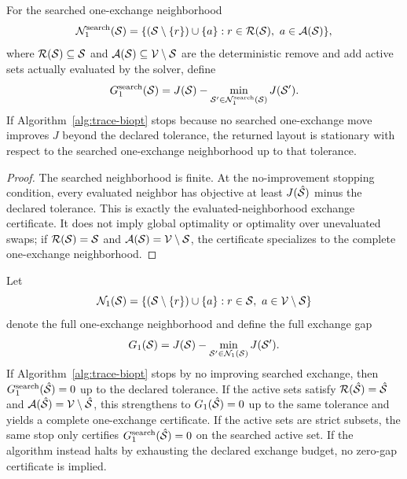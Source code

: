 \begin{theorem}
\label{thm:exchange}
For the searched one-exchange neighborhood
\[
    \mathcal{N}^{\mathrm{search}}_1(\calS)
    =
    \{(\calS\setminus\{r\})\cup\{a\}: r\in\calR(\calS),\ a\in\calA(\calS)\},
\]
where $\mathcal{R}(\mathcal{S})\subseteq\mathcal{S}$ and $\mathcal{A}(\mathcal{S})\subseteq\mathcal{V}\setminus\mathcal{S}$
are the deterministic remove and add active sets actually evaluated by the
solver, define
\[
    G^{\mathrm{search}}_1(\mathcal{S})
    =
    J(\mathcal{S})-\min_{\mathcal{S}'\in\mathcal{N}^{\mathrm{search}}_1(\mathcal{S})}J(\mathcal{S}').
\]
If Algorithm~\ref{alg:trace-biopt} stops because no searched one-exchange move
improves $J$ beyond the declared tolerance, the returned layout is stationary
with respect to the searched one-exchange neighborhood up to that tolerance.
\end{theorem}

\begin{proof}
The searched neighborhood is finite. At the no-improvement stopping condition,
every evaluated neighbor has objective at least $J(\hat{\mathcal{S}})$ minus the
declared tolerance. This is exactly the evaluated-neighborhood exchange
certificate. It does not imply global optimality or optimality over unevaluated
swaps; if $\mathcal{R}(\mathcal{S})=\mathcal{S}$ and $\mathcal{A}(\mathcal{S})=\mathcal{V}\setminus\mathcal{S}$, the
certificate specializes to the complete one-exchange neighborhood.
\end{proof}

\begin{proposition}
\label{prop:exchange-gap-scope}
Let
\[
    \mathcal{N}_1(\calS)
    =
    \{(\calS\setminus\{r\})\cup\{a\}: r\in\calS,\ a\in\calV\setminus\calS\}
\]
denote the full one-exchange neighborhood and define the full exchange gap
\[
    G_1(\mathcal{S})=J(\mathcal{S})-\min_{\mathcal{S}'\in\mathcal{N}_1(\mathcal{S})}J(\mathcal{S}').
\]
If Algorithm~\ref{alg:trace-biopt} stops by no improving searched exchange,
then $G^{\mathrm{search}}_1(\hat{\mathcal{S}})=0$ up to the declared tolerance. If
the active sets satisfy $\mathcal{R}(\hat{\mathcal{S}})=\hat{\mathcal{S}}$ and
$\mathcal{A}(\hat{\mathcal{S}})=\mathcal{V}\setminus\hat{\mathcal{S}}$, this strengthens to
$G_1(\hat{\mathcal{S}})=0$ up to the same tolerance and yields a complete
one-exchange certificate. If the active sets are strict subsets, the same stop
only certifies $G^{\mathrm{search}}_1(\hat{\mathcal{S}})=0$ on the searched active
set. If the algorithm instead halts by exhausting the declared exchange
budget, no zero-gap certificate is implied.
\end{proposition}

